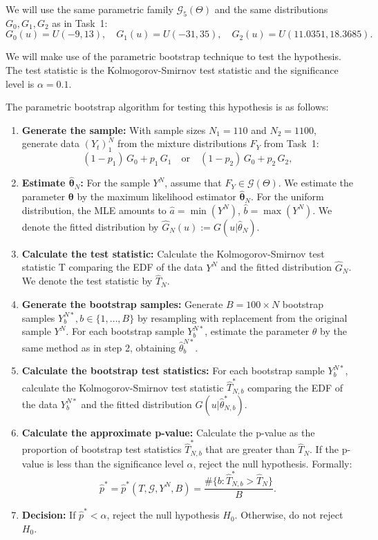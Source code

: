 \documentclass{article}
\begin{document}
We will use the same parametric family \(\mathcal{G}_5(\Theta)\) and the same distributions \(G_0, G_1, G_2\) as in Task~1:
\[
    G_0(u) = U(-9, 13), \quad G_1(u) = U(-31, 35), \quad G_2(u) = U(11.0351, 18.3685).
\]

We will make use of the parametric bootstrap technique to test the hypothesis. The test statistic is the Kolmogorov-Smirnov test statistic and the significance level is \(\alpha = 0.1\).

The parametric bootstrap algorithm for testing this hypothesis is as follows:

\begin{enumerate}
    \item \textbf{Generate the sample:} With sample sizes \(N_1 = 110\) and \(N_2 = 1100\), generate data \((Y_t)_{1}^N\) from the mixture distributions \(F_Y\) from Task~1:
    \[
      (1 - p_1) \, G_0 + p_1 \, G_1  
      \quad\text{or}\quad  
      (1 - p_2) \, G_0 + p_2 \, G_2,
    \]  
    \item \textbf{Estimate \(\hat{\boldsymbol{\theta}}_N\):} For the sample \(Y^N\), assume that \(F_Y \in \mathcal{G}(\Theta)\). We estimate the parameter \(\boldsymbol{\theta}\) by the maximum likelihood estimator \(\hat{\boldsymbol{\theta}}_N\). For the uniform distribution, the MLE amounts to \(\hat{a} = \min(Y^N)\), \(\hat{b} = \max(Y^N)\). We denote the fitted distribution by \(\hat{G}_N(u) := G(u|\hat{\theta}_N)\).
    \item \textbf{Calculate the test statistic:} Calculate the Kolmogorov-Smirnov test statistic T comparing the EDF of the data \(Y^N\) and the fitted distribution \(\hat{G}_N\). We denote the test statistic by \(\hat{T}_N\).
    \item \textbf{Generate the bootstrap samples:} Generate \(B = 100 \times N\) bootstrap samples \( Y^{N*}_b, b \in \{1, \ldots, B\} \) by resampling with replacement from the original sample \(Y^N\). For each bootstrap sample \(Y^{N*}_b\), estimate the parameter \(\theta\) by the same method as in step 2, obtaining \(\hat{\theta}^{N*}_b\).
    \item \textbf{Calculate the bootstrap test statistics:} For each bootstrap sample \(Y^{N*}_b\), calculate the Kolmogorov-Smirnov test statistic \(\hat{T}^*_{N,b}\) comparing the EDF of the data \(Y^{N*}_b\) and the fitted distribution \(G(u|\hat{\theta}^*_{N,b})\).
    \item \textbf{Calculate the approximate p-value:} Calculate the p-value as the proportion of bootstrap test statistics \(\hat{T}^*_{N,b}\) that are greater than \(\hat{T}_N\). If the p-value is less than the significance level \(\alpha\), reject the null hypothesis. Formally:
    \[
        \hat{p}^* = \hat{p}^*(T, \mathcal{G}, Y^N, B) = \frac{\#\{b: \hat{T}^*_{N,b} > \hat{T}_N\}}{B}.
    \]
    \item \textbf{Decision:} If \(\hat{p}^* < \alpha\), reject the null hypothesis \(H_0\). Otherwise, do not reject \(H_0\).
\end{enumerate}
\end{document}

